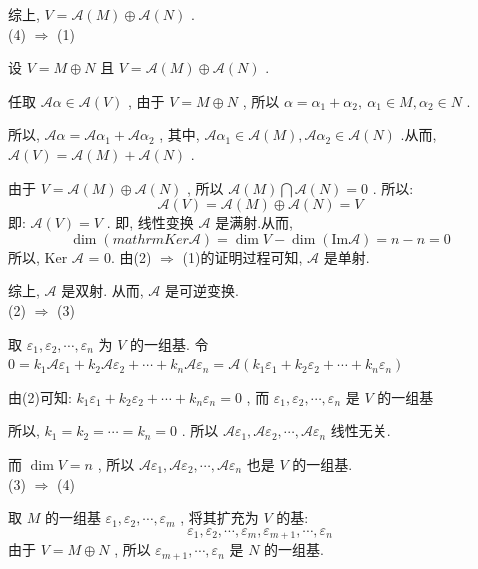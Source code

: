 \documentclass[11pt,a4paper,openany,oneside]{book}
\begin{document}
综上,  $ V = \mathcal{A}(M) \oplus  \mathcal{A}(N) $ . \\ 

(4)  $ \Longrightarrow $  (1)

设 $ V = M \oplus  N $ 且 $ V = \mathcal{A}(M) \oplus  \mathcal{A}(N) $ .

任取 $ \mathcal{A}\alpha \in \mathcal{A}(V) $ , 由于 $ V = M \oplus  N $ , 所以 $ \alpha = \alpha_1 + \alpha_2, \ \alpha_1 \in M , \alpha_2 \in N  $ .

所以,  $ \mathcal{A}\alpha = \mathcal{A}\alpha_1 + \mathcal{A}\alpha_2 $ , 其中,  $ \mathcal{A}\alpha_1 \in \mathcal{A}(M), \mathcal{A}\alpha_2 \in \mathcal{A}(N) $ .从而,  $ \mathcal{A}(V) = \mathcal{A}(M) + \mathcal{A}(N) $ .

由于 $ V= \mathcal{A}(M) \oplus  \mathcal{A}(N)  $ , 所以 $ \mathcal{A}(M) \bigcap \mathcal{A}(N)=0 $ . 所以:
 $$  \mathcal{A}(V) = \mathcal{A}(M) \oplus  \mathcal{A}(N) = V $$ 
即: $ \mathcal{A}(V) = V $ . 即, 线性变换 $ \mathcal{A} $ 是满射.从而,
 $$  \dim ( mathrm{Ker} \mathcal{A}) = \dim V - \dim ( \mathrm{Im} \mathcal{A}) = n - n = 0  $$ 
所以, Ker $ \mathcal{A} $  = {0}. 由(2) $ \Longrightarrow $ (1)的证明过程可知,  $ \mathcal{A} $ 是单射.

综上,  $ \mathcal{A} $ 是双射. 从而,  $ \mathcal{A} $ 是可逆变换.  \\

(2)  $ \Longrightarrow $  (3)

取 $ \varepsilon_1, \varepsilon_2, \cdots, \varepsilon_n $ 为 $ V $ 的一组基. 令 $  0 = k_1\mathcal{A}\varepsilon_1 + k_2\mathcal{A}\varepsilon_2 + \cdots + k_n\mathcal{A}\varepsilon_n = \mathcal{A}(k_1\varepsilon_1 + k_2\varepsilon_2 + \cdots + k_n\varepsilon_n)  $ 

由(2)可知:  $ k_1\varepsilon_1 + k_2\varepsilon_2 + \cdots + k_n\varepsilon_n = 0 $ , 而 $ \varepsilon_1, \varepsilon_2, \cdots, \varepsilon_n $ 是 $ V $ 的一组基

所以,  $ k_1 = k_2 = \cdots = k_n = 0 $ . 所以 $ \mathcal{A}\varepsilon_1, \mathcal{A}\varepsilon_2, \cdots, \mathcal{A}\varepsilon_n $ 线性无关.

而 $ \dim V = n $ , 所以 $ \mathcal{A}\varepsilon_1, \mathcal{A}\varepsilon_2, \cdots, \mathcal{A}\varepsilon_n $ 也是 $ V $ 的一组基.  \\ 

(3)  $ \Rightarrow $  (4) 

取 $ M $ 的一组基 $ \varepsilon_1, \varepsilon_2, \cdots, \varepsilon_m $ , 将其扩充为 $ V $ 的基:
 $$  \varepsilon_1, \varepsilon_2, \cdots, \varepsilon_m, \varepsilon_{m+1}, \cdots, \varepsilon_n  $$ 
由于 $  V = M \oplus  N $ , 所以 $ \varepsilon_{m+1}, \cdots, \varepsilon_n $ 是 $ N $ 的一组基.
\end{document}
